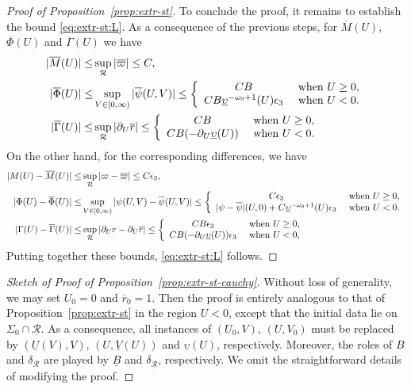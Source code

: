 \documentclass[10pt, reqno]{amsart}
\theoremstyle{definition}
\theoremstyle{remark}
\theoremstyle{conjecture}
\numberwithin{equation}{section}
\newcommand{\abs}[1]{\vert#1\vert}
\newcommand{\rd}{\partial}
\newcommand{\0}{\emptyset}
\newcommand{\Gmm}{\Gamma}
\newcommand{\dlt}{\delta}
\newcommand{\eps}{\epsilon}
\newcommand{\Sgm}{\Sigma}
\newcommand{\omg}{\omega}
\newcommand{\ups}{\upsilon}
\newcommand{\calR}{\mathcal R}
\newcommand{\psibg}{\overline{\psi}}				%
\newcommand{\rbg}{\overline{r}}					%
\newcommand{\varpibg}{\overline{\varpi}}				%
\newcommand{\Phibg}{\overline{\Phi}}				%
\begin{document}
\begin{proof}[Proof of Proposition~\ref{prop:extr-st}]
To conclude the proof, it remains to establish the bound \eqref{eq:extr-st:L}. As a consequence of the previous steps, for $\overline{M}(U)$, $\overline{\Phi}(U)$ and $\overline{\Gmm}(U)$ we have
\begin{align*}
	\abs{\overline{M}(U)} 
\leq &\sup_{\calR} \abs{\varpibg}
 \leq C , \\
	\abs{\Phibg(U)} 
\leq & \sup_{V \in [0, \infty)} \abs{\psibg(U, V)} 
\leq \left\{
	\begin{array}{cl}
		C B & \hbox{ when } U \geq 0, \\
		C B \underline{\ups}^{-\omg_0+1}(U) \eps_{3} & \hbox{ when } U < 0 .
	\end{array}
	\right. \\
	\abs{\overline{\Gmm}(U)} 
\leq & \sup_{\calR} \abs{\rd_{U} \rbg}  
\leq \left\{
	\begin{array}{cl}
		C B & \hbox{ when } U \geq 0, \\
		C B (- \rd_{U} \underline{\ups}(U)) & \hbox{ when } U < 0 .
	\end{array}
	\right. 
\end{align*}
On the other hand, for the corresponding differences, we have
\begin{align*}
	\abs{M(U) - \overline{M}(U)} 
\leq &\sup_{\calR} \abs{\varpi - \varpibg}
 \leq C \eps_{3}, \\
	\abs{\Phi(U) - \Phibg(U)} 
\leq & \sup_{V \in [0, \infty)} \abs{\psi(U, V) - \psibg(U, V)} 
\leq \left\{
	\begin{array}{cl}
		C \eps_{3} & \hbox{ when } U \geq 0, \\
		\abs{\psi - \psibg}(U, 0) + C \underline{\ups}^{-\omg_0+1}(U) \eps_{3} & \hbox{ when } U < 0 .
	\end{array}
	\right. \\
	\abs{\Gmm(U) - \overline{\Gmm}(U)} 
\leq & \sup_{\calR} \abs{\rd_{U} r - \rd_{U} \rbg}  
\leq \left\{
	\begin{array}{cl}
		C B \eps_{3} & \hbox{ when } U \geq 0, \\
		C B (-\rd_{U} \underline{\ups}(U)) \eps_{3} & \hbox{ when } U < 0 ,
	\end{array}
	\right. 
\end{align*}
Putting together these bounds, \eqref{eq:extr-st:L} follows. \qedhere
\end{proof}

\begin{proof}[Sketch of Proof of Proposition~\ref{prop:extr-st-cauchy}]
Without loss of generality, we may set $U_{0} = 0$ and $\rbg_{0} = 1$. Then the proof is entirely analogous to that of Proposition~\ref{prop:extr-st} in the region $U < 0$, except that the initial data lie on $\Sgm_{0} \cap \underline{\calR}$. As a consequence, all instances of $(U_{0}, V)$, $(U, V_{0})$ must be replaced by $(\underline{U}(V), V)$, $(U, \underline{V}(U))$ and $\underline{\ups}(U)$, respectively. Moreover, the roles of $B$ and $\dlt_{\calR}$ are played by $\underline{B}$ and $\dlt_{\underline{\calR}}$, respectively. We omit the straightforward details of modifying the proof. \qedhere
\end{proof}
\end{document}
